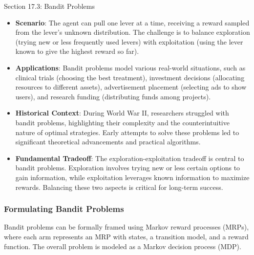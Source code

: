 \begin{notes}{Section 17.3: Bandit Problems}
\begin{highlight}
        \begin{itemize}
            \item \textbf{Scenario}: The agent can pull one lever at a time, receiving a reward sampled from the lever's unknown distribution. The challenge is to balance exploration (trying new or 
            less frequently used levers) with exploitation (using the lever known to give the highest reward so far).
            \item \textbf{Applications}: Bandit problems model various real-world situations, such as clinical trials (choosing the best treatment), investment decisions (allocating resources to 
            different assets), advertisement placement (selecting ads to show users), and research funding (distributing funds among projects).
            \item \textbf{Historical Context}: During World War II, researchers struggled with bandit problems, highlighting their complexity and the counterintuitive nature of optimal strategies. 
            Early attempts to solve these problems led to significant theoretical advancements and practical algorithms.
            \item \textbf{Fundamental Tradeoff}: The exploration-exploitation tradeoff is central to bandit problems. Exploration involves trying new or less certain options to gain information, while 
            exploitation leverages known information to maximize rewards. Balancing these two aspects is critical for long-term success.
        \end{itemize}
    
    \end{highlight}
    
    \subsubsection*{Formulating Bandit Problems}
    
    Bandit problems can be formally framed using Markov reward processes (MRPs), where each arm represents an MRP with states, a transition model, and a reward function. The overall problem is modeled 
    as a Markov decision process (MDP).
    
    \begin{highlight}
    

\end{highlight}
\end{notes}
